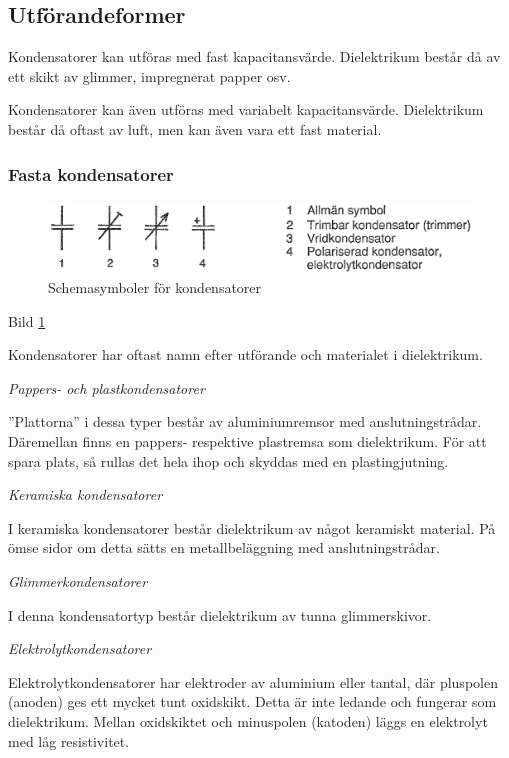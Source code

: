 \subsection{Utförandeformer}

Kondensatorer kan utföras med fast kapacitansvärde.
Dielektrikum består då av ett skikt av glimmer, impregnerat papper osv.

Kondensatorer kan även utföras med variabelt kapacitansvärde.
Dielektrikum består då oftast av luft, men kan även vara ett fast material.

\subsubsection{Fasta kondensatorer}

\begin{figure}[ht]
\includegraphics[width=\textwidth]{images/cropped_pdfs/bild_2_2-02.pdf}
\caption{Schemasymboler för kondensatorer}
\label{fig:BildII2-2}
\end{figure}

Bild \ref{fig:BildII2-2}

Kondensatorer har oftast namn efter utförande och materialet i dielektrikum.

\emph{Pappers- och plastkondensatorer}

''Plattorna'' i dessa typer består av aluminiumremsor med anslutningstrådar.
Däremellan finns en pappers- respektive plastremsa som dielektrikum. För att
spara plats, så rullas det hela ihop och skyddas med en plastingjutning.

\emph{Keramiska kondensatorer}

I keramiska kondensatorer består dielektrikum av något keramiskt material.
På ömse sidor om detta sätts en metallbeläggning med anslutningstrådar.

\emph{Glimmerkondensatorer}

I denna kondensatortyp består dielektrikum av tunna glimmerskivor.

\emph{Elektrolytkondensatorer}

Elektrolytkondensatorer har elektroder av aluminium eller tantal, där pluspolen
(anoden) ges ett mycket tunt oxidskikt. Detta är inte ledande och fungerar som
dielektrikum. Mellan oxidskiktet och minuspolen (katoden) läggs en elektrolyt
med låg resistivitet.


